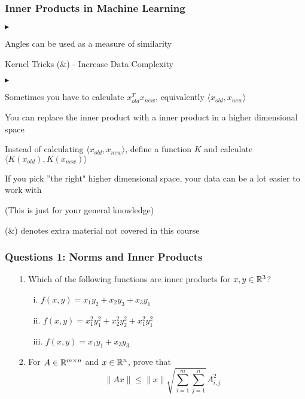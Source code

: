 \documentclass{beamer}
\renewenvironment{itemize}
\renewenvironment{enumerate}%
{\begin{list}{\arabic{enumi}.}%
      {\setlength{\leftmargin}{2.5em}%
       \setlength{\itemsep}{-\parsep}%
       \setlength{\topsep}{-\parskip}%
       \usecounter{enumi}}%
 }{\end{list}}
\renewenvironment{itemize}%
{\begin{list}{$\blacktriangleright$}%
      {\setlength{\leftmargin}{2.5em}%
       \setlength{\itemsep}{-\parsep}%
       \setlength{\topsep}{-\parskip}%
       \usecounter{enumi}}%
 }{\end{list}}
\begin{document}
\begin{frame}
\frametitle{Inner Products in Machine Learning}
\begin{itemize}
\item Angles can be used as a measure of similarity
\item Kernel Tricks (\&) - Increase Data Complexity
\begin{itemize}
\item Sometimes you have to calculate  $x_{old}^T x_{new}$, equivalently $ \langle x_{old},x_{new} \rangle $
\item You can replace the inner product with a inner product in a higher dimensional space
\item Instead of calculating $ \langle x_{old},x_{new} \rangle $, define a function $K$ and calculate $ \langle K(x_{old}),K(x_{new}) \rangle $
\item If you pick ''the right" higher dimensional space, your data can be a lot easier to work with
\item (This is just for your general knowledge)
\item (\&) denotes extra material not covered in this course
\end{itemize}
\end{itemize}
\end{frame}


\begin{frame}
\frametitle{Questions 1: Norms and Inner Products}

\begin{enumerate}
\item[1.] Which of the following functions are inner products for $x,y\in\mathbb{R}^3$?
\begin{enumerate}
\item[i.] $f(x,y) = x_1y_2+x_2y_3+x_3y_1$
\item[ii.] $f(x,y) = x_1^2y_1^2+x_2^2y_2^2+x_1^2y_1^2$
\item[iii.] $f(x,y) = x_1y_1+x_3y_3$
\end{enumerate}
\item[2.] For $A \in \mathbb{R}^{m\times n}$ and $x\in \mathbb{R}^n$, prove that
$$ \|Ax\| \leq \|x\|\sqrt{\sum_{i=1}^m \sum_{j=1}^n} A_{i,j}^2$$
\end{enumerate}

\end{frame}
\end{document}
